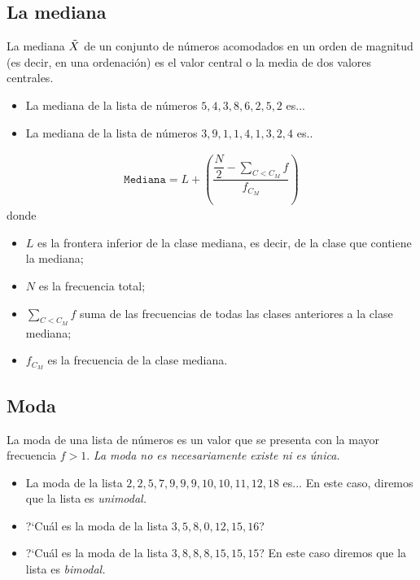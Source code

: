 \subsection{La mediana}
La mediana $\tilde{X}$ de un conjunto de números acomodados en un orden de magnitud (es decir, en una ordenación) es el valor central o la media de dos valores centrales.


\begin{ejemplo}
	\begin{itemize}
		\item La mediana de la lista de números $5, 4, 3, 8, 6, 2, 5, 2$ es... 
		\item La mediana de la lista de números $3, 9, 1, 1, 4, 1, 3, 2, 4$ es..
	\end{itemize}	
\end{ejemplo}





\begin{definicion}
	\begin{align}
		\texttt{Mediana}=L+\left(
		\dfrac{ \dfrac{N}{2}-\sum_{{C<C_{M}}}f}{f_{C_{M}}}
		\right)
	\end{align}
	donde 
	\begin{itemize}
		\item $L$ es la frontera inferior de la clase mediana, es decir, de la clase que contiene la mediana;
		\item $N$ es la frecuencia total; 
		\item $\sum_{{C<C_{M}}}f$ suma de las frecuencias de todas las clases anteriores a la clase mediana; 
		\item $f_{C_{M}}$ es la frecuencia de la clase mediana.
	\end{itemize}
	
\end{definicion}


\subsection{Moda}
La moda de una lista de números es un valor que se presenta con la mayor frecuencia $f>1$.  \emph{La moda no es necesariamente existe ni es única.}


\begin{ejemplo}
	\begin{itemize}
		\item La moda de la lista $2,2,5,7,9,9,9,10,10,11,12,18$ es...  En este caso, diremos que la lista es \emph{unimodal.}
		\item ?`Cuál es la moda de la lista $3,5,8,0,12,15,16$? 
		\item ?`Cuál es la moda de la lista $3,8,8,8,15,15,15$?  En este caso diremos que la lista es \emph{bimodal.}
	\end{itemize}
	
\end{ejemplo}



